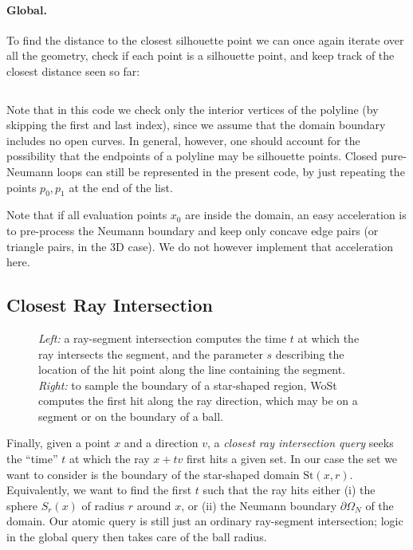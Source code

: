 \documentclass{article}
\newcommand{\todo}[1]{\textbf{\hl{TODO: #1}}}
\newcommand{\St}{\text{St}}
\renewcommand{\vec}[1]{#1}
\begin{document}
\paragraph{Global.} To find the distance to the closest silhouette point we can once again iterate over all the geometry, check if each point is a silhouette point, and keep track of the closest distance seen so far:

\inputminted[fontsize=\small,linenos,firstline=77,lastline=88,bgcolor=bg]{cpp}{../code/WoStLaplace2D.cpp}
Note that in this code we check only the interior vertices of the polyline (by skipping the first and last index), since we assume that the domain boundary includes no open curves.  In general, however, one should account for the possibility that the endpoints of a polyline may be silhouette points.  Closed pure-Neumann loops can still be represented in the present code, by just repeating the points \(\vec{p}_0, \vec{p}_1\) at the end of the list.

Note that if all evaluation points \(x_0\) are inside the domain, an easy acceleration is to pre-process the Neumann boundary and keep only concave edge pairs (or triangle pairs, in the 3D case).  We do not however implement that acceleration here.

\subsection{Closest Ray Intersection}
\label{sec:ClosestRayIntersection}

\begin{figure}[h!]
   \centering
   
   \label{fig:RayIntersectionExample}
   \caption{\emph{Left:} a ray-segment intersection computes the time \(t\) at which the ray intersects the segment, and the parameter \(s\) describing the location of the hit point along the line containing the segment. \emph{Right:} to sample the boundary of a star-shaped region, WoSt computes the first hit along the ray direction, which may be on a segment or on the boundary of a ball.}
\end{figure}

Finally, given a point \(\vec{x}\) and a direction \(\vec{v}\), a \emph{closest ray intersection query} seeks the ``time'' \(t\) at which the ray \(\vec{x} + t\vec{v}\) first hits a given set.  In our case the set we want to consider is the boundary of the star-shaped domain \(\St(\vec{x},r)\).  Equivalently, we want to find the first \(t\) such that the ray hits either (i) the sphere \(S_r(\vec{x})\) of radius \(r\) around \(\vec{x}\), or (ii) the Neumann boundary \(\partial\Omega_N\) of the domain.  Our atomic query is still just an ordinary ray-segment intersection; logic in the global query then takes care of the ball radius.
\end{document}
